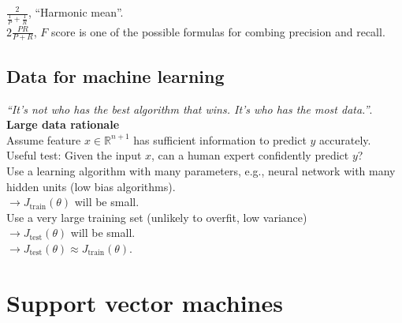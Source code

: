 $\frac{2}{\frac{1}{P} + \frac{1}{R}}$, ``Harmonic mean''.\\

$2\frac{PR}{P + R}$, $F$ score is one of the possible formulas for combing precision and recall.

%
\subsection{Data for machine learning}
\emph{\textcolor{Bittersweet}{``It's not who has the best algorithm that wins. It's who has the most data.''}}.\\

\textbf{Large data rationale}\\
Assume feature $x \in \mathbb{R}^{n+1}$ has sufficient information to predict $y$ accurately.\\
Useful test: Given the input $x$, can a human expert confidently predict $y$?\\

Use a learning algorithm with many parameters, e.g., neural network with many hidden units (low bias algorithms).\\
$\rightarrow J_{\text{train}}(\theta)$ will be small.\\

Use a very large training set (unlikely to overfit, low variance)\\
$\rightarrow J_{\text{test}}(\theta)$ will be small.\\
$\rightarrow J_{\text{test}}(\theta) \approx J_{\text{train}}(\theta)$.\\


\section{Support vector machines}
\label{sec:Support vector machines}

%
